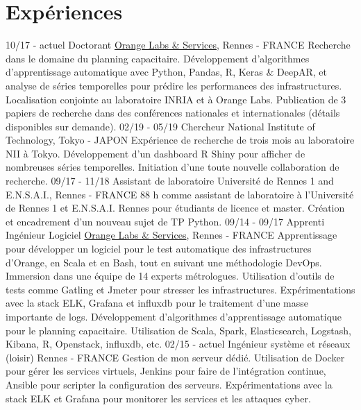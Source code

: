 \documentclass[]{friggeri-cv}
\begin{document}
\section{Expériences}
\begin{entrylist}
  \entry
    {10/17 - actuel}
    {Doctorant}
    {\href{http://www.orange.com/en/home}{Orange Labs \& Services}, Rennes - FRANCE}
    {
    Recherche dans le domaine du planning capacitaire.
    Développement d’algorithmes d’apprentissage automatique avec Python, Pandas, R, Keras \& DeepAR, et analyse de séries temporelles pour prédire les performances des infrastructures.
    Localisation conjointe au laboratoire INRIA et à Orange Labs.
    Publication de 3 papiers de recherche dans des conférences nationales et internationales (détails disponibles sur demande).
    }
  \entry
    {02/19 - 05/19}
    {Chercheur}
    {National Institute of Technology, Tokyo - JAPON}
    {Expérience de recherche de trois mois au laboratoire NII à Tokyo.
    Développement d'un dashboard R Shiny pour afficher de nombreuses séries temporelles.
    Initiation d'une toute nouvelle collaboration de recherche.
    }
  \entry
    {09/17 - 11/18}
    {Assistant de laboratoire}
    {Université de Rennes 1 and E.N.S.A.I., Rennes - FRANCE}
    {88 h comme assistant de laboratoire à l'Université de Rennes 1 et E.N.S.A.I. Rennes pour étudiants de licence et master.
    Création et encadrement d'un nouveau sujet de TP Python.%
    }
  \entry
    {09/14 - 09/17}
    {Apprenti Ingénieur Logiciel}
    {\href{http://www.orange.com/en/home}{Orange Labs \& Services}, Rennes - FRANCE}
    {Apprentissage pour développer un logiciel pour le test automatique des infrastructures d’Orange, en Scala et en Bash, tout en suivant une méthodologie DevOps. Immersion dans une équipe de 14 experts métrologues. 
    Utilisation d’outils de tests comme Gatling et Jmeter pour stresser les infrastructures.
    Expérimentations avec la stack ELK, Grafana et influxdb pour le traitement d’une masse importante de logs.
    Développement d’algorithmes d’apprentissage automatique pour le planning capacitaire.
    Utilisation de Scala, Spark, Elasticsearch, Logstash, Kibana, R, Openstack, influxdb, etc.    
}
  \entry
    {02/15 - actuel}
    {Ingénieur système et réseaux (loisir)}
    {Rennes - FRANCE}
    {Gestion de mon serveur dédié.
    Utilisation de Docker pour gérer les services virtuels, Jenkins pour faire de l'intégration continue, Ansible pour scripter la configuration des serveurs. Expérimentations avec la stack ELK et Grafana pour monitorer les services et les attaques cyber.    
   }
\end{entrylist}
\end{document}

